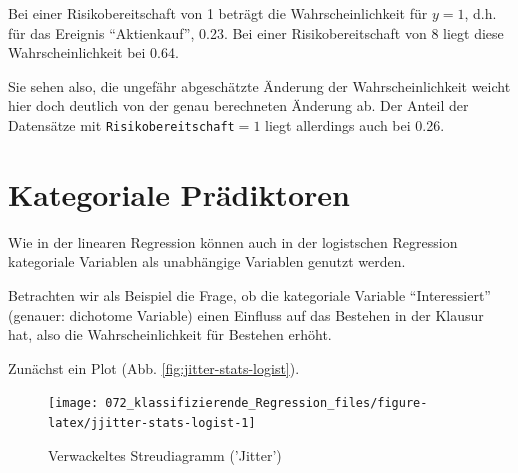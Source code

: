 \documentclass[12pt,ngerman,]{book}
\makeatletter
\newenvironment{Shaded}{\begin{snugshade}}{\end{snugshade}}
\newcommand{\KeywordTok}[1]{\textcolor[rgb]{0.13,0.29,0.53}{\textbf{{#1}}}}
\newcommand{\DataTypeTok}[1]{\textcolor[rgb]{0.13,0.29,0.53}{{#1}}}
\newcommand{\DecValTok}[1]{\textcolor[rgb]{0.00,0.00,0.81}{{#1}}}
\newcommand{\StringTok}[1]{\textcolor[rgb]{0.31,0.60,0.02}{{#1}}}
\newcommand{\NormalTok}[1]{{#1}}
\newenvironment{kframe}{%
\medskip{}
\setlength{\fboxsep}{.8em}
 \def\at@end@of@kframe{}%
 \ifinner\ifhmode%
  \def\at@end@of@kframe{\end{minipage}}%
  \begin{minipage}{\columnwidth}%
 \fi\fi%
 \def\FrameCommand##1{\hskip\@totalleftmargin \hskip-\fboxsep
 \colorbox{shadecolor}{##1}\hskip-\fboxsep
     \hskip-\linewidth \hskip-\@totalleftmargin \hskip\columnwidth}%
 \MakeFramed {\advance\hsize-\width
   \@totalleftmargin\z@ \linewidth\hsize
   \@setminipage}}%
 {\par\unskip\endMakeFramed%
 \at@end@of@kframe}
\renewenvironment{Shaded}{\begin{kframe}}{\end{kframe}}
\theoremstyle{definition}
\theoremstyle{definition}
\theoremstyle{remark}
\makeatother
\begin{document}
Bei einer Risikobereitschaft von 1 beträgt die Wahrscheinlichkeit für
\(y=1\), d.h. für das Ereignis ``Aktienkauf'', 0.23. Bei einer
Risikobereitschaft von 8 liegt diese Wahrscheinlichkeit bei 0.64.

Sie sehen also, die ungefähr abgeschätzte Änderung der
Wahrscheinlichkeit weicht hier doch deutlich von der genau berechneten
Änderung ab. Der Anteil der Datensätze mit
\texttt{Risikobereitschaft}\(=1\) liegt allerdings auch bei 0.26.

\section{Kategoriale Prädiktoren}\label{kategoriale-pradiktoren}

Wie in der linearen Regression können auch in der logistschen Regression
kategoriale Variablen als unabhängige Variablen genutzt werden.

Betrachten wir als Beispiel die Frage, ob die kategoriale Variable
``Interessiert'' (genauer: dichotome Variable) einen Einfluss auf das
Bestehen in der Klausur hat, also die Wahrscheinlichkeit für Bestehen
erhöht.

\begin{Shaded}
\end{Shaded}

Zunächst ein Plot (Abb. \ref{fig:jitter-stats-logist}).

\begin{Shaded}
\end{Shaded}

\begin{figure}

{\centering \texttt{[image: 072\_klassifizierende\_Regression\_files/figure-latex/jjitter-stats-logist-1]} 

}

\caption{Verwackeltes Streudiagramm ('Jitter')}\label{fig:jjitter-stats-logist}
\end{figure}
\end{document}
